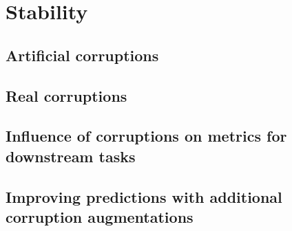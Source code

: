 \section{Stability}
    \subsection{Artificial corruptions}
        
    \subsection{Real corruptions}
    \subsection{Influence of corruptions on metrics for downstream tasks}
    \subsection{Improving predictions with additional corruption augmentations}
        